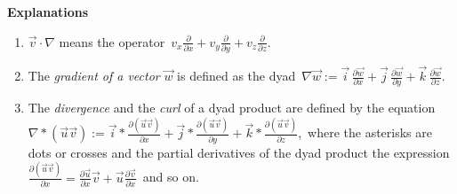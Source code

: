 \documentclass[12pt]{article}
\theoremstyle{definition}
\begin{document}
\textbf{Explanations}
\begin{enumerate}
 \item $\vec{v}\cdot\nabla$ means the operator\, 
$v_x\frac{\partial}{\partial x}+v_y\frac{\partial}{\partial y}
+v_z\frac{\partial}{\partial z}$.
 \item The {\em gradient of a vector} $\vec{w}$ is defined as the dyad\, 
$\nabla\vec{w} := \vec{i}\,\frac{\partial\vec{w}}{\partial x}
+\vec{j}\,\frac{\partial\vec{w}}{\partial y}
+\vec{k}\,\frac{\partial\vec{w}}{\partial z}$.
 \item The {\em divergence} and the {\em curl} of a dyad product are defined by the equation\\
$\nabla\!*\!(\vec{u}\vec{v}) := 
\vec{i}\!*\!\frac{\partial(\vec{u}\vec{v})}{\partial x}
\!+\!\vec{j}\!*\!\frac{\partial(\vec{u}\vec{v})}{\partial y}
\!+\!\vec{k}\!*\!\frac{\partial(\vec{u}\vec{v})}{\partial z}$,\, where the asterisks are dots or crosses and the partial derivatives of the dyad product  the expression\, 
$\frac{\partial(\vec{u}\vec{v})}{\partial x} = 
\frac{\partial\vec{u}}{\partial x}\vec{v}+
\vec{u}\frac{\partial\vec{v}}{\partial x}$\, and so on.
\end{enumerate}
\end{document}
